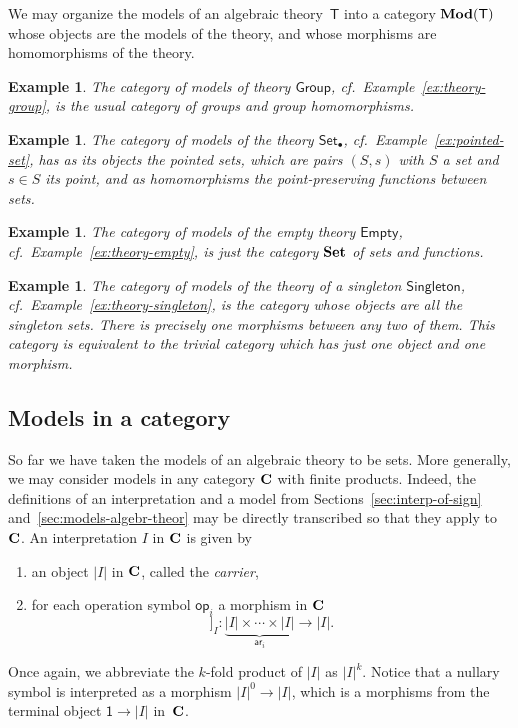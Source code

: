 \documentclass{amsart}
\newcommand{\theory}[1]{\mathsf{#1}} %
\newcommand{\Mod}[1]{\text{\textbf{Mod}}(\theory{#1})} %
\newcommand{\category}[1]{\text{\textbf{#1}}} %
\newcommand{\carrier}[1]{|#1|} %
\newcommand{\op}[1]{\mathsf{op}_{#1}} %
\newcommand{\arity}[1]{\mathsf{ar}_{#1}} %
\newcommand{\one}{\mathsf{1}} %
\newcommand{\sem}[1]{[\![#1]\!]} %
\newtheorem{example}[definition]{Example}
\begin{document}
We may organize the models of an algebraic theory~$\theory{T}$ into a category $\Mod{T}$
whose objects are the models of the theory, and whose morphisms are homomorphisms of the
theory.

\begin{example}
  The category of models of theory $\theory{Group}$, cf.\ Example~\ref{ex:theory-group},
  is the usual category of groups and group homomorphisms.
\end{example}

\begin{example}
  The category of models of the theory $\theory{Set_\bullet}$, cf.\
  Example~\ref{ex:pointed-set}, has as its objects the pointed sets, which are pairs
  $(S, s)$ with $S$ a set and $s \in S$ its \emph{point}, and as homomorphisms
  the point-preserving functions between sets.
\end{example}

\begin{example}
  The category of models of the empty theory $\theory{Empty}$, cf.\
  Example~\ref{ex:theory-empty}, is just the category $\category{Set}$ of sets and
  functions.
\end{example}

\begin{example}
  The category of models of the theory of a singleton $\theory{Singleton}$, cf.\
  Example~\ref{ex:theory-singleton}, is the category whose objects are all the singleton
  sets. There is precisely one morphisms between any two of them. This category is
  equivalent to the trivial category which has just one object and one morphism.
\end{example}

\subsection{Models in a category}
\label{sec:models-category}

So far we have taken the models of an algebraic theory to be sets. More generally, we may
consider models in any category $\category{C}$ with finite products. Indeed, the
definitions of an interpretation and a model from Sections~\ref{sec:interp-of-sign}
and~\ref{sec:models-algebr-theor} may be directly transcribed so that they apply
to~$\category{C}$. An interpretation $I$ in $\category{C}$ is given by
%
\begin{enumerate}
\item an object $\carrier{I}$ in $\category{C}$, called the \emph{carrier},
\item for each operation symbol $\op{i}$ a morphism in $\category{C}$
  \begin{equation*}
    \sem{\op{i}}_I : \underbrace{\carrier{I} \times \cdots \times \carrier{I}}_{\arity{i}} \to \carrier{I}.
  \end{equation*}
\end{enumerate}
%
Once again, we abbreviate the $k$-fold product of $\carrier{I}$ as $\carrier{I}^k$. Notice that a nullary
symbol is interpreted as a morphism $\carrier{I}^0 \to \carrier{I}$, which is a morphisms from the
terminal object $\one \to \carrier{I}$ in~$\category{C}$.
\end{document}
